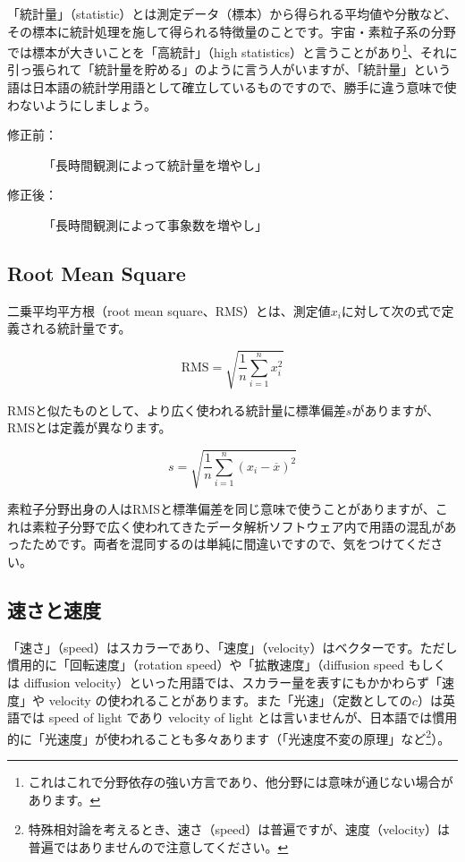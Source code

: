 「統計量」（statistic）とは測定データ（標本）から得られる平均値や分散など、その標本に統計処理を施して得られる特徴量のことです。宇宙・素粒子系の分野では標本が大きいことを「高統計」（high statistics）と言うことがあり\footnote{これはこれで分野依存の強い方言であり、他分野には意味が通じない場合があります。}、それに引っ張られて「統計量を貯める」のように言う人がいますが、「統計量」という語は日本語の統計学用語として確立しているものですので、勝手に違う意味で使わないようにしましょう。

\begin{description}
\item[修正前：]「長時間観測によって統計量を増やし」
\item[修正後：]「長時間観測によって事象数を増やし」
\end{description}

\subsection{Root Mean Square}

二乗平均平方根（root mean square、RMS）とは、測定値$x_i$に対して次の式で定義される統計量です。

\begin{equation}
\mathrm{RMS} = \sqrt{{\frac{1}{n} \sum \limits _{i=1}^n x_{i}^2}}
\end{equation}

RMSと似たものとして、より広く使われる統計量に標準偏差$s$がありますが、RMSとは定義が異なります。

\begin{equation}
 s = \sqrt{\frac{1}{n} \sum \limits _{i=1}^n (x_i - {\overline{x}})^2}
\end{equation}

素粒子分野出身の人はRMSと標準偏差を同じ意味で使うことがありますが、これは素粒子分野で広く使われてきたデータ解析ソフトウェア内で用語の混乱があったためです。両者を混同するのは単純に間違いですので、気をつけてください。

\subsection{速さと速度}

「速さ」（speed）はスカラーであり、「速度」（velocity）はベクターです。ただし慣用的に「回転速度」（rotation speed）や「拡散速度」（diffusion speed もしくは diffusion velocity）といった用語では、スカラー量を表すにもかかわらず「速度」や velocity の使われることがあります。また「光速」（定数としての$c$）は英語では speed of light であり velocity of light とは言いませんが、日本語では慣用的に「光速度」が使われることも多々あります（「光速度不変の原理」など\footnote{特殊相対論を考えるとき、速さ（speed）は普遍ですが、速度（velocity）は普遍ではありませんので注意してください。}）。

